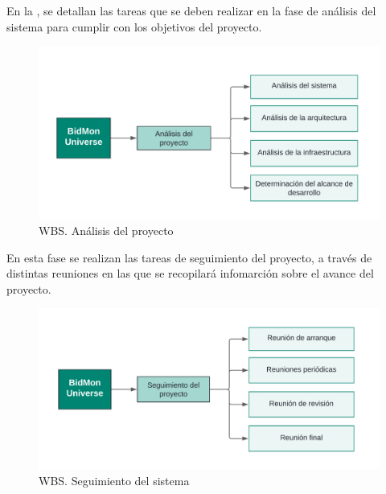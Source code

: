 En la , se detallan las tareas que se deben realizar en la fase de análisis del sistema para cumplir con los objetivos del proyecto.
\begin{figure}[H]
    \hypertarget{fig:5_WBS-Analisis}{}
    \centering
    \includegraphics[width=0.7\linewidth]{figures/5-WBS/5_WBS-Analisis.png}
    \caption{WBS. Análisis del proyecto}
    \label{fig:5_WBS-Analisis}
\end{figure}

En esta fase se realizan las tareas de seguimiento del proyecto, a través de distintas reuniones en las que se recopilará infomarción sobre el avance del proyecto. 
\begin{figure}[H]
    \hypertarget{fig:5_WBS-Seguimiento}{}
    \centering
    \includegraphics[width=0.7\linewidth]{figures/5-WBS/5_WBS-Seguimiento.png}
    \caption{WBS. Seguimiento del sistema}
    \label{fig:5_WBS-Seguimiento}
\end{figure}

